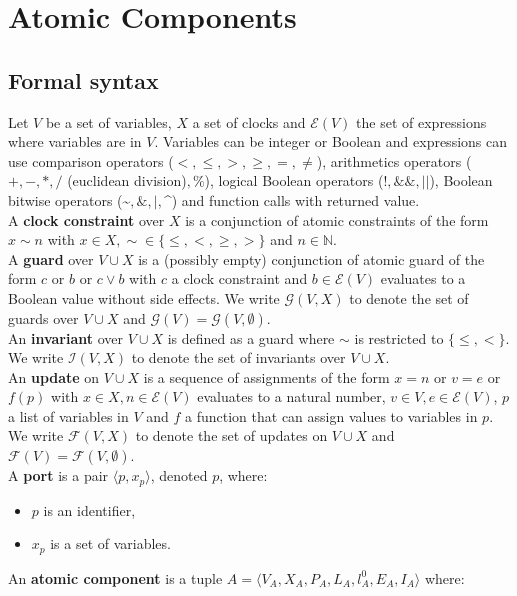 \documentclass[a4paper]{article}
\begin{document}
\section*{Atomic Components}
\subsection*{Formal syntax}
Let $V$ be a set of variables, $X$ a set of clocks and $\mathcal{E}(V)$ the set of expressions where variables are in
$V$. Variables can be integer or Boolean and expressions can use comparison operators ($<,\leq,>,\geq,=,\neq$),
arithmetics operators ($+,-,*,/$ (euclidean division)$,\%$), logical Boolean operators ($!, \&\&, ||$), Boolean bitwise
operators (\textasciitilde$, \&, |,$\textasciicircum) and function calls with returned value.\\
A \textbf{clock constraint} over $X$ is a conjunction of atomic constraints of the form
$x \sim n$ with $x \in X, \sim \in \{\leq, <, \geq, >\}$ and $n \in \mathbb{N}$. \\
A \textbf{guard} over $V \cup X$ is a (possibly empty) conjunction of atomic guard of the form $c$ or $b$ or $c \vee b$
with $c$ a clock constraint and $b \in \mathcal{E}(V)$ evaluates to a Boolean value without side effects. We write
$\mathcal{G}(V, X)$ to denote the set of guards over $V \cup X$ and $\mathcal{G}(V) = \mathcal{G}(V, \emptyset)$. \\
An \textbf{invariant} over $V \cup X$ is defined as a guard where $\sim$ is restricted to $\{\leq, <\}$. We write
$\mathcal{I}(V, X)$ to denote the set of invariants over $V \cup X$. \\
An \textbf{update} on $V \cup X$ is a sequence of assignments of the form $x = n$ or $v = e$ or $f(p)$ with
$x \in X, n \in \mathcal{E}(V)$ evaluates to a natural number, $v \in V, e \in \mathcal{E}(V)$, $p$ a list of variables
in $V$ and $f$ a function that can assign values to variables in $p$. We write $\mathcal{F}(V,X)$ to denote the set of
updates on $V \cup X$ and $\mathcal{F}(V) = \mathcal{F}(V,\emptyset)$.\\
A \textbf{port} is a pair $\langle p, x_p \rangle$, denoted $p$, where:
\begin{itemize}
  \item $p$ is an identifier,
  \item $x_p$ is a set of variables.
\end{itemize}
An \textbf{atomic component} is a tuple $A = \langle V_A, X_A, P_A, L_A, l_A^0, E_A, I_A \rangle$ where:
\end{document}
